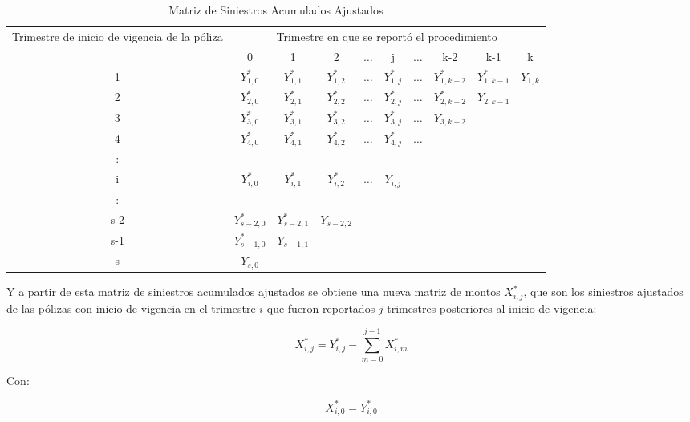 \documentclass[11pt,twoside,openright,spanish]{report}
\numberwithin{equation}{chapter}
\numberwithin{figure}{chapter}
\numberwithin{table}{chapter}
\begin{document}
	\begin{table}[ht]
		\centering
		\caption{Matriz de Siniestros Acumulados Ajustados}
		\begin{tabularx}{\linewidth}{ c |ccccccccc}
			\multirow{2}{4cm}{Trimestre de inicio de vigencia de la póliza}
			& \multicolumn{9}{c}{Trimestre en que se reportó el procedimiento} \\ 
			& 0  & 1 & 2 & $ \dots $ & j & $\dots $ & k-2 & k-1 &  k \\
			\midrule
			1      &  $Y_{1,0}^{*}$ & $Y_{1,1}^{*}$ & $Y_{1,2}^{*}$ & $ \dots $ & $Y_{1,j}^{*}$ & $ \dots $ & $Y_{1,k-2}^{*}$ & $Y_{1,k-1}^{*}$ & $Y_{1,k}^{}$ \\
			2      &  $Y_{2,0}^{*}$ & $Y_{2,1}^{*}$ & $Y_{2,2}^{*}$ & $ \dots $ & $Y_{2,j}^{*}$ & $ \dots $ & $Y_{2,k-2}^{*}$ & $Y_{2,k-1}^{}$ & \\
			3      &  $Y_{3,0}^{*}$ & $Y_{3,1}^{*}$ & $Y_{3,2}^{*}$ & $ \dots $ & $Y_{3,j}^{*}$ & $ \dots $ & $Y_{3,k-2}^{}$ & & \\
			4      &  $Y_{4,0}^{*}$ & $Y_{4,1}^{*}$ & $Y_{4,2}^{*}$ & $ \dots $ & $Y_{4,j}^{*}$ & $ \dots $ & & & \\
			:      & & & & & & & & & \\
			i      &  $Y_{i,0}^{*}$ & $Y_{i,1}^{*}$ & $Y_{i,2}^{*}$ & $ \dots $ & $Y_{i,j}^{}$ & & & & \\
			:      & & & & & & & & & \\
			s-2      &  $Y_{s-2,0}^{*}$ & $Y_{s-2,1}^{*}$ & $Y_{s-2,2}^{}$ & & & & & & \\
			s-1      &  $Y_{s-1,0}^{*}$ & $Y_{s-1,1}^{}$ & & & & & & & \\
			s      &  $Y_{s,0}^{}$ & & & & & & & & \\
		\end{tabularx}
	\end{table}\label{matrizsiniestrosacumulados}
	
	Y a partir de esta matriz de siniestros acumulados ajustados se obtiene una nueva matriz de montos $X_{i,j}^{*}$, que son los siniestros ajustados de las pólizas con inicio de vigencia en el trimestre $i$ que fueron reportados $j$ trimestres posteriores al inicio de vigencia:
	
	\begin{equation}
	{X}_{i,j}^{*}={Y}_{i,j}^{*}-\sum _{m=0}^{j-1}{X}_{i,m}^{*}
	\label{eq6}
	\end{equation}	
	 
	Con:
	
	$${X}_{i,0}^{*}={Y}_{i,0}^{*}$$ 
	
\end{document}
